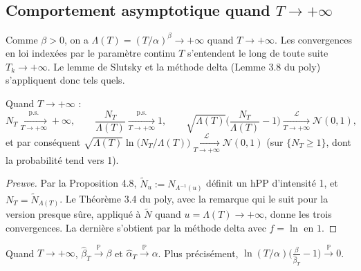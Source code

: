 \subsection{Comportement asymptotique quand $T\to+\infty$}\label{sec:asymptotique}

Comme $\beta>0$, on a $\Lambda(T)=(T/\alpha)^\beta\to+\infty$ quand $T\to+\infty$. Les convergences en loi indexées par le paramètre continu $T$ s'entendent le long de toute suite $T_k\to+\infty$. Le lemme de Slutsky et la méthode delta (Lemme 3.8 du poly) s'appliquent donc tels quels.

\begin{lemme}[Comportement de $N_T$]\label{lem:NT}
Quand $T\to+\infty$ :
\[
N_T\xrightarrow[T\to+\infty]{\text{p.s.}}+\infty,\qquad
\frac{N_T}{\Lambda(T)}\xrightarrow[T\to+\infty]{\text{p.s.}}1,\qquad
\sqrt{\Lambda(T)}\Big(\frac{N_T}{\Lambda(T)}-1\Big)\xrightarrow[T\to+\infty]{\mathcal{L}}\mathcal{N}(0,1),
\]
et par conséquent $\sqrt{\Lambda(T)}\ln\big(N_T/\Lambda(T)\big)\xrightarrow[T\to+\infty]{\mathcal{L}}\mathcal{N}(0,1)$ (sur $\{N_T\ge1\}$, dont la probabilité tend vers 1).
\end{lemme}

\begin{proof}[Preuve]
Par la Proposition 4.8, $\tilde N_u:=N_{\Lambda^{-1}(u)}$ définit un hPP d'intensité 1, et $N_T=\tilde N_{\Lambda(T)}$. Le Théorème 3.4 du poly, avec la remarque qui le suit pour la version presque sûre, appliqué à $\tilde N$ quand $u=\Lambda(T)\to+\infty$, donne les trois convergences. La dernière s'obtient par la méthode delta avec $f=\ln$ en $1$.
\end{proof}

\begin{proposition}[Consistance, {[CT97, Prop.~3.7]}]\label{prop:consistance}
Quand $T\to+\infty$, $\hat\beta_T\xrightarrow{\mathbb{P}}\beta$ et $\hat\alpha_T\xrightarrow{\mathbb{P}}\alpha$. Plus précisément, $\ln(T/\alpha)\big(\frac{\beta}{\hat\beta_T}-1\big)\xrightarrow{\mathbb{P}}0$.
\end{proposition}

